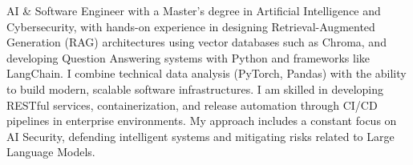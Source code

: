 

\begin{cvparagraph}

AI \& Software Engineer with a Master's degree in Artificial Intelligence and Cybersecurity, with hands-on experience in designing Retrieval-Augmented Generation (RAG) architectures using vector databases such as Chroma, and developing Question Answering systems with Python and frameworks like LangChain. I combine technical data analysis (PyTorch, Pandas) with the ability to build modern, scalable software infrastructures. I am skilled in developing RESTful services, containerization, and release automation through CI/CD pipelines in enterprise environments. My approach includes a constant focus on AI Security, defending intelligent systems and mitigating risks related to Large Language Models.
\end{cvparagraph}

